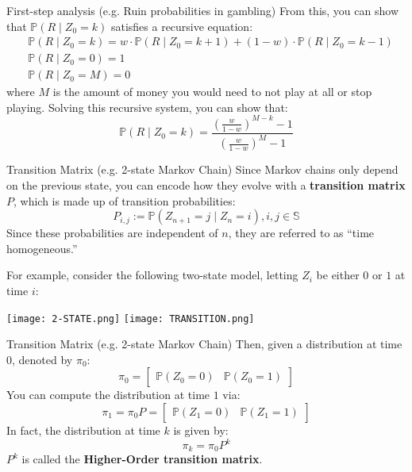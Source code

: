 \documentclass{beamer}
\newcommand{\Pb}{\mathbb{P}}
\newcommand{\Ss}{\mathbb{S}}
\begin{document}
\begin{frame}{First-step analysis (e.g. Ruin probabilities in gambling)}
From this, you can show that $\Pb(R \mid Z_0 = k)$ satisfies a recursive equation:
\begin{align*}
&\Pb(R \mid Z_0 = k) = w\cdot \Pb(R \mid Z_0 = k+1) + (1-w)\cdot\Pb(R \mid Z_0 = k-1)\\
&\Pb(R \mid Z_0 = 0) = 1\\
&\Pb(R \mid Z_0 = M) = 0
\end{align*}
where $M$ is the amount of money you would need to not play at all or stop playing. Solving this recursive system, you can show that:
$$\Pb(R \mid Z_0 = k) = \frac{\left(\frac{w}{1-w}\right)^{M-k}-1}{\left(\frac{w}{1-w}\right)^{M}-1} $$
\end{frame}

\begin{frame}{Transition Matrix (e.g. 2-state Markov Chain) }
Since Markov chains only depend on the previous state, you can encode how they evolve with a \textbf{transition matrix} $P$, which is made up of transition probabilities:
$$P_{i,j} := \Pb(Z_{n+1} = j \mid Z_n =i), i,j \in \Ss $$
Since these probabilities are independent of $n$, they are referred to as ``time homogeneous.''
\newline

    For example, consider the following two-state model, letting $Z_i$ be either $0$ or $1$ at time $i$:
    \begin{center}
            \texttt{[image: 2-STATE.png]}
    \texttt{[image: TRANSITION.png]}
    \end{center}

\end{frame}

\begin{frame}{Transition Matrix (e.g. 2-state Markov Chain)}
Then, given a distribution at time $0$, denoted by $\pi_0$:
$$\pi_0 = \begin{bmatrix}
    \Pb(Z_0 = 0) & \Pb(Z_0 = 1)
    \end{bmatrix}$$
You can compute the distribution at time $1$ via:
$$ \pi_1 = \pi_0 P= \begin{bmatrix}
\Pb(Z_1 = 0) & \Pb(Z_1 = 1)
\end{bmatrix}$$
    In fact, the distribution at time $k$ is given by:
    $$\pi_k = \pi_0 P^k$$
$P^k$ is called the \textbf{Higher-Order transition matrix}.
\end{frame}
\end{document}
